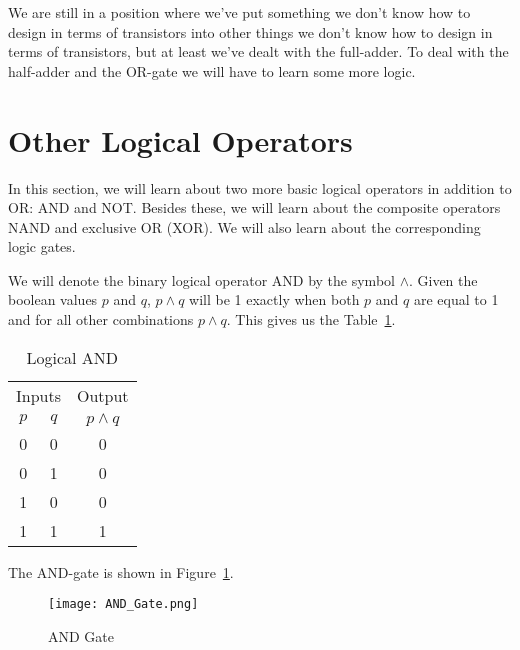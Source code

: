 We are still in a position where we've put something we don't know how to design in terms of transistors into other things we don't know how to design in terms of transistors, but at least we've dealt with the full-adder.  To deal with the half-adder and the OR-gate we will have to learn some more logic.

\section{Other Logical Operators}

In this section, we will learn about two more basic logical operators in addition to OR: AND and NOT. Besides these, we will learn about the composite operators NAND and exclusive OR (XOR).  We will also learn about the corresponding logic gates.

We will denote the binary logical operator AND by the symbol $\wedge$. Given the boolean values $p$ and $q$, $p\wedge q$ will be 1 exactly when both $p$ and $q$ are equal to 1 and for all other combinations $p\wedge q$.  This gives us the Table~\ref{table:logical_and}.
\begin{table}
		\begin{center}			
	\begin{tabular}{ccc}
		\multicolumn{2}{c}{Inputs} & Output \\
		$p$ & $q$ & $p\wedge q$  \\ \hline
		0     & 0     &    0 \\
		0     & 1     &    0  \\
		1     & 0     &    0 \\
		1     & 1     &   1
	\end{tabular}
\end{center}
\caption{Logical AND}\label{table:logical_and}
\end{table}
The AND-gate is shown in Figure~\ref{figure:and_gate}.
\begin{figure}
		\begin{center}			
		\texttt{[image: AND\_Gate.png]}
		\end{center}
		\caption{AND Gate}\label{figure:and_gate}
\end{figure}

